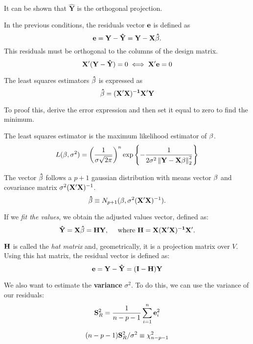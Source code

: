 It can be shown that \(\hat{\mathbf{Y}}\) is the orthogonal projection.

\begin{ndef}
In the previous conditions, the residuals vector \(\mathbf{e}\) is defined as
\[
\mathbf{e} = \mathbf{Y} - \mathbf{\hat{Y}} = \mathbf{Y} - \mathbf{X\hat\beta}. 
\]
This residuals must be orthogonal to the columns of the design matrix.
\[ 
\mathbf{X}'( \mathbf{Y} -  \mathbf{\hat{Y}}) = 0 \;\Longleftrightarrow\; \mathbf{X}' \mathbf{e} = 0
\]
\end{ndef}

\begin{nprop}
The least squares estimators \(\mathbf{\hat \beta}\) is expressed as
\[
\mathbf{\hat \beta} = \mathbf{(X'X)^{-1}X'Y}  
\]
\end{nprop}

To proof this, derive the error expression and then set it equal to zero to find the minimum.

\begin{nprop}
The least squares estimator is the maximum likelihood estimator of \(\mathbf{\beta}\).
\[
L(\mathbf{\beta},\sigma^2) = \left(\frac{1}{\sigma \sqrt{2\pi}}\right)^n \exp\left\{-\frac{1}{2\sigma^2 \left\lVert\mathbf{Y} - \mathbf{X}\mathbf{\beta}\right\rVert_2^2}\right\}  
\]
\end{nprop}

\begin{nprop}
The vector \(\mathbf{\hat \beta}\) follows a \(p+1\) gaussian distribution with means vector \(\mathbf{\beta}\) and covariance matrix \(\sigma^2(\mathbf{X'X})^{-1}\).
\[
\mathbf{\hat \beta} \equiv N_{p+1}(\mathbf{\beta},\sigma^2(\mathbf{X'X})^{-1} ).  
\]
\end{nprop}



If we \emph{fit the values}, we obtain the adjusted values vector, defined as:
\[
 \mathbf{\hat{Y}} = \mathbf{X}  \mathbf{\hat\beta} = \mathbf{HY}, \quad \text{ where } \mathbf{H} = \mathbf{X(X'X)^{-1}X'}  .
\]

\(\mathbf{H}\) is called the \emph{hat matrix} and, geometrically, it is a projection matrix over \(V\). Using this hat matrix, the residual vector is defined as:
\[
\mathbf{e} = \mathbf{Y} -  \mathbf{\hat Y} = \mathbf{(I-H)Y}  
\]

We also want to estimate the \textbf{variance} \(\sigma^2\). To do this, we can use the variance of our residuals:
\[
\mathbf{S}^2_R = \frac{1}{n-p-1} \sum_{i=1}^n \mathbf{e}_i^2
\]

\begin{nprop}
\[
(n-p-1)\mathbf{S}^2_R/\sigma^2 \equiv \chi_{n-p-1}^2  
\]
\end{nprop}

